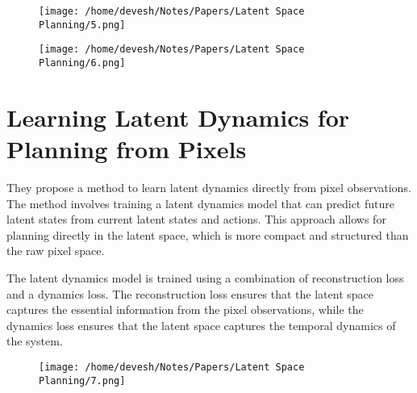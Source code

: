 \documentclass[12pt]{article}
\begin{document}
\begin{figure}[ht]
    \centering
    \begin{minipage}{0.45\textwidth}
        \centering
        \texttt{[image: /home/devesh/Notes/Papers/Latent Space Planning/5.png]}
        \caption{}
        \label{}
    \end{minipage}
    \hfill
    \begin{minipage}{0.45\textwidth}
        \centering
        \texttt{[image: /home/devesh/Notes/Papers/Latent Space Planning/6.png]}
        \caption{}
        \label{}
    \end{minipage}
\end{figure}

\newpage
\section{Learning Latent Dynamics for Planning from Pixels}
They propose a method to learn latent dynamics directly from pixel observations. The method involves training a latent dynamics model that can predict future latent states from current latent states and actions. This approach allows for planning directly in the latent space, which is more compact and structured than the raw pixel space.

The latent dynamics model is trained using a combination of reconstruction loss and a dynamics loss. The reconstruction loss ensures that the latent space captures the essential information from the pixel observations, while the dynamics loss ensures that the latent space captures the temporal dynamics of the system.

\begin{figure}[ht]
    \centering
    \texttt{[image: /home/devesh/Notes/Papers/Latent Space Planning/7.png]}
    \caption{}
    \label{}
\end{figure}
\end{document}
